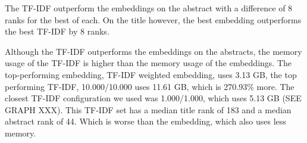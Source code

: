 \documentclass[../../Thesis.tex]{subfiles}
\begin{document}
The TF-IDF outperform the embeddings on the abstract with a difference of 8 ranks for the best of each. On the title however, the best embedding outperforms the best TF-IDF by 8 ranks. 

Although the TF-IDF outperforms the embeddings on the abstracts, the memory usage of the TF-IDF is higher than the memory usage of the embeddings. The top-performing embedding, TF-IDF weighted embedding, uses 3.13 GB, the top performing TF-IDF, 10.000/10.000 uses 11.61 GB, which is 270.93\% more. The closest TF-IDF configuration we used was 1.000/1.000, which uses 5.13 GB (SEE GRAPH XXX). This TF-IDF set has a median title rank of 183 and a median abstract rank of 44. Which is worse than the embedding, which also uses less memory.
\end{document}
